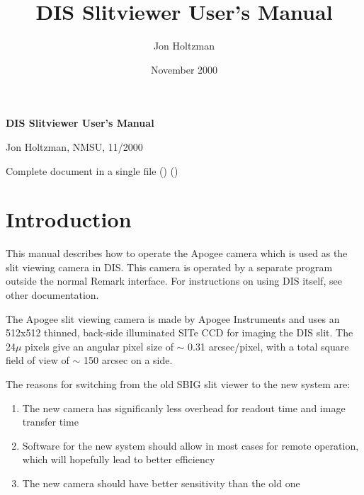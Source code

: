\documentclass[10pt]{article}
\title{\Huge\bf DIS Slitviewer User's Manual}
\author{\Large
Jon Holtzman
}
\date{\Large November 2000}
\renewcommand{\[}{\begin{eqnarray}}
\renewcommand{\]}{\end{eqnarray}}
\begin{document}
\setcounter{page}{1}


\begin{center}
\textbf{DIS Slitviewer User's Manual}
\end{center}
\begin{center}
Jon Holtzman, NMSU, 11/2000
\end{center}

\begin{htmlonly}
Complete document in a single file 
()
()
\end{htmlonly}




\setcounter{page}{1}

\section{Introduction}

This manual describes how to operate the Apogee camera which is used as
the slit viewing camera in DIS. This camera is operated by a separate
program outside the normal Remark interface. For instructions on using
DIS itself, see other documentation.

The Apogee slit viewing camera is made by Apogee Instruments and uses
an 512x512 thinned, back-side illuminated SITe CCD for imaging the
DIS slit. The 24$\mu$ pixels give an angular pixel size of $\sim$ 0.31
arcsec/pixel, with a total square field of view of $\sim$ 150 arcsec on
a side.

The reasons for switching from the old SBIG slit viewer to the new system are:
\begin{enumerate}
  \item The new camera has significanly less overhead for readout time and
        image transfer time
  \item Software for the new system should allow in most cases for remote
        operation, which will hopefully lead to better efficiency
  \item The new camera should have better sensitivity than the old one
\end{enumerate}
\end{document}
